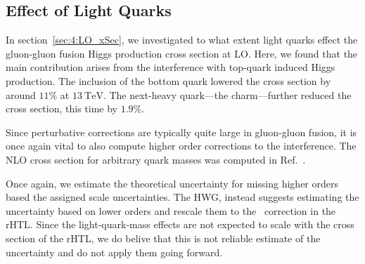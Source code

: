 \subsection{Effect of Light Quarks} \label{subsec:4:effect_of_light_quarks}
In section~\ref{sec:4:LO_xSec}, we investigated to what extent light quarks effect the gluon-gluon fusion Higgs production cross section at \acs{LO}. Here, we found that the main contribution arises from the interference with top-quark induced Higgs production. The inclusion of the bottom quark lowered the cross section by around $11\%$ at $13\ \mathrm{TeV}$. The next-heavy quark---the charm---further reduced the cross section, this time by $1.9\%$.

Since perturbative corrections are typically quite large in gluon-gluon fusion, it is once again vital to also compute higher order corrections to the interference. The \acs{NLO} cross section for arbitrary quark masses was computed in Ref.~\cite{Graudenz:1992pv}.

Once again, we estimate the theoretical uncertainty for missing higher orders based the assigned scale uncertainties. The HWG, instead suggests estimating the uncertainty based on lower orders and rescale them to the \NNNLO\ correction in the \acs{rHTL}. Since the light-quark-mass effects are not expected to scale with the cross section of the \acs{rHTL}, we do belive that this is not reliable estimate of the uncertainty and do not apply them going forward.


